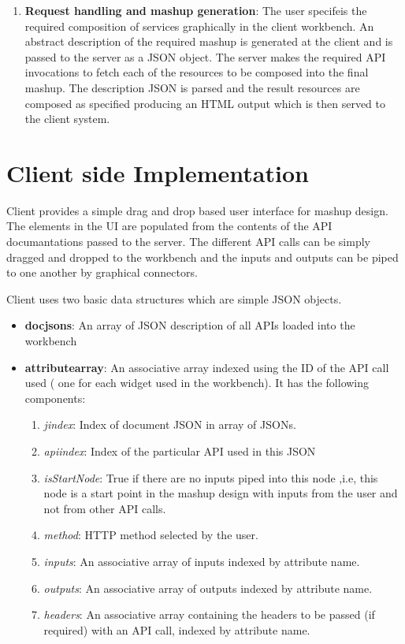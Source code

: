 \begin{spacing}{1.5}
\begin{enumerate}
\item{\bf Request handling and mashup generation}: The user specifeis the required composition of services graphically in the client workbench. An abstract description of the required mashup is generated at the client and is passed to the server as a JSON object. The server makes the required API invocations to fetch each of the resources to be composed into the final mashup. The description JSON is parsed and the result resources are composed as specified producing an HTML output which is then served to the client system.
\end{enumerate}

\section{Client side Implementation}
Client provides a simple drag and drop based user interface for mashup design. The elements in the UI are populated from the contents of the API documantations passed to the server. The different API calls can be simply dragged and dropped to the workbench and the inputs and outputs can be piped to one another by graphical connectors.

Client uses two basic data structures which are simple JSON objects.
\begin{itemize}
\item{\bf docjsons}: An array of JSON description of all APIs loaded into the workbench
\item{\bf attributearray}: An associative array indexed using the ID of the API call used ( one for each widget used in the workbench). It has the following components:
\begin{enumerate}
\item{\it jindex}: Index of document JSON in array of JSONs.
\item{\it apiindex}: Index of the particular API used in this JSON
\item{\it isStartNode}: True if there are no inputs piped into this node ,i.e, this node is a start point in the mashup design with inputs from the user and not from other API calls.
\item{\it method}: HTTP method selected by the user.
\item{\it inputs}: An associative array of inputs indexed by attribute name.
\item{\it outputs}: An associative array of outputs indexed by attribute name.
\item{\it headers}: An associative array containing the headers to be passed (if required) with an API call, indexed by attribute name.
\end{enumerate}


\end{itemize}
\end{spacing}
